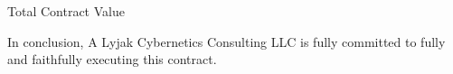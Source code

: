 \documentclass[8pt, letterpaper]{awesome-cv} %
\begin{document}
\begin{cvletter}
\begin{description}

    \item[Total Contract Value] 

  \end{description}

  In conclusion, A Lyjak Cybernetics Consulting LLC is fully committed to fully and faithfully
  executing this contract. \\

\end{cvletter}
 \\\\\\\\\\
 \\



\end{document}
